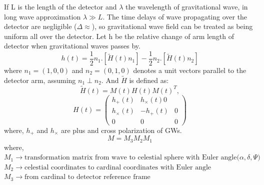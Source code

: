 \documentclass{ttuthes2007}
\begin{document}
If L is the length of the detector and $\lambda$ the wavelength of gravitational
wave, in long wave approximation $\lambda \gg L$. The time delays of
wave propagating over the detector are negligible ($\Delta \approx $), so
gravitational wave field can be treated as being uniform all over the detector.
Let h be the relative change of arm length of detector when gravitational waves
passes by.
\begin{equation}
h(t) = \frac{1}{2} n_1.[\tilde{H}(t)n_1] - \frac{1}{2} n_2. [\tilde{H}(t)n_2]
\end{equation}
where $n_1=(1,0,0)$ and $n_2=(0,1,0)$ denotes a unit vectors parallel to the
detector arm, assuming $n_1 \perp n_2$. And $\tilde{H}$ is defined as:
\begin{equation}
\tilde{H}(t) = M(t)H(t)M(t)^T,
\end{equation}
\begin{equation*}
H(t)=
\begin{pmatrix}
h_+(t) & h_\times(t) 0\\
h_\times(t) & -h_+(t) & 0\\
0 & 0 & 0
\end{pmatrix}
\end{equation*}
where, $h_+$ and $h_\times$ are plus and cross polarization of \acp{GW}.
\begin{equation}
M= M_3 M_2 M_1
\end{equation}
where,
$M_1 \rightarrow \text{transformation matrix from wave to celestial sphere with
Euler angle($\alpha,\delta,\Psi$)}$\\
$M_2 \rightarrow \text{celestial coordinates to cardinal coordinates with Euler
angle}$\\
$M_3 \rightarrow \text{from cardinal to detector reference frame}$
\end{document}
